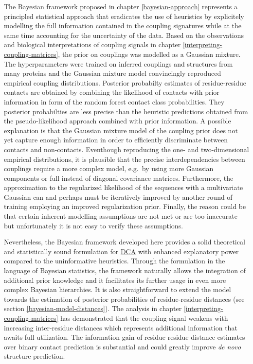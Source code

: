 \documentclass[11pt,a4paper,twoside]{book}
\theoremstyle{definition}
\theoremstyle{definition}
\theoremstyle{remark}
\begin{document}
The Bayesian framework proposed in chapter \ref{bayesian-approach}
represents a principled statistical approach that eradicates the use of
heuristics by explicitely modelling the full information contained in
the coupling signatures while at the same time accounting for the
uncertainty of the data. Based on the observations and biological
interpretations of coupling signals in chapter
\ref{interpreting-coupling-matrices}, the prior on couplings was
modelled as a Gaussian mixture. The hyperparameters were trained on
inferred couplings and structures from many proteins and the Gaussian
mixture model convincingly reproduced empirical coupling distributions.
Posterior probabilty estimates of residue-residue contacts are obtained
by combining the likelihood of contacts with prior information in form
of the random forest contact class probabilities. They posterior
probabilties are less precise than the heuristic predictions obtained
from the pseudo-likelihood approach combined with prior information. A
possible explanation is that the Gaussian mixture model of the coupling
prior does not yet capture enough information in order to efficiently
discriminate between contacts and non-contacts. Eventhough reproducing
the one- and two-dimensional empirical distributions, it is plausible
that the precise interdependencies between couplings require a more
complex model, e.g.~by using more Gaussian components or full instead of
diagonal covariance matrices. Furthermore, the approximation to the
regularized likelihood of the sequences with a multivariate Gaussian can
and perhaps must be iteratively improved by another round of training
employing an improved regularization prior. Finally, the reason could be
that certain inherent modelling assumptions are not met or are too
inaccurate but unfortunately it is not easy to verify these assumptions.

Nevertheless, the Bayesian framework developed here provides a solid
theoretical and statistically sound formulation for
\protect\hyperlink{abbrev}{DCA} with enhanced explanatory power compared
to the uninformative heuristics. Through the formulation in the language
of Bayesian statistics, the framework naturally allows the integration
of additional prior knowledge and it facilitates its further usage in
even more complex Bayesian hierarchies. It is also straightforward to
extend the model towards the estimation of posterior probabilities of
residue-residue distances (see section \ref{bayesian-model-distances}).
The analysis in chapter \ref{interpreting-coupling-matrices} has
demonstrated that the coupling signal weakens with increasing
inter-residue distances which represents additional information that
awaits full utilization. The information gain of residue-residue
distance estimates over binary contact prediction is substantial and
could greatly improve \emph{de novo} structure prediction.
\end{document}
